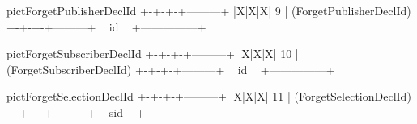 \begin{SaveVerbatim}{pictForgetPublisherDeclId}
+-+-+-+---------+
|X|X|X|    9    | (ForgetPublisherDeclId)
+-+-+-+---------+
~      id       ~
+---------------+
\end{SaveVerbatim}
\begin{SaveVerbatim}{pictForgetSubscriberDeclId}
+-+-+-+---------+
|X|X|X|   10    | (ForgetSubscriberDeclId)
+-+-+-+---------+
~      id       ~
+---------------+
\end{SaveVerbatim}
\begin{SaveVerbatim}{pictForgetSelectionDeclId}
+-+-+-+---------+
|X|X|X|   11    | (ForgetSelectionDeclId)
+-+-+-+---------+
~      sid      ~
+---------------+
\end{SaveVerbatim}
